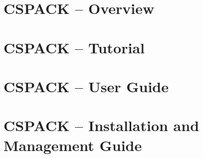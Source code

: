 
\setcounter{secnumdepth}{2}
\setcounter{tocdepth}{2}
\setlongtables
\makeindex
\PScommands%


\setcounter{page}{1}
\part{CSPACK -- Overview}

\part{CSPACK -- Tutorial}

\part{CSPACK -- User Guide}

\part{CSPACK -- Installation and Management Guide}

\begin{appendix}

\end{appendix}



